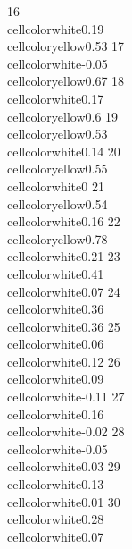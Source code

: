 \documentclass{article}\usepackage[]{graphicx}\usepackage[]{color}
\begin{document}
16   \\cellcolor{white}{0.19} \\cellcolor{yellow}{0.53}
17  \\cellcolor{white}{-0.05} \\cellcolor{yellow}{0.67}
18   \\cellcolor{white}{0.17}  \\cellcolor{yellow}{0.6}
19  \\cellcolor{yellow}{0.53}  \\cellcolor{white}{0.14}
20  \\cellcolor{yellow}{0.55}     \\cellcolor{white}{0}
21  \\cellcolor{yellow}{0.54}  \\cellcolor{white}{0.16}
22  \\cellcolor{yellow}{0.78}  \\cellcolor{white}{0.21}
23   \\cellcolor{white}{0.41}  \\cellcolor{white}{0.07}
24   \\cellcolor{white}{0.36}  \\cellcolor{white}{0.36}
25   \\cellcolor{white}{0.06}  \\cellcolor{white}{0.12}
26   \\cellcolor{white}{0.09} \\cellcolor{white}{-0.11}
27   \\cellcolor{white}{0.16} \\cellcolor{white}{-0.02}
28  \\cellcolor{white}{-0.05}  \\cellcolor{white}{0.03}
29   \\cellcolor{white}{0.13}  \\cellcolor{white}{0.01}
30   \\cellcolor{white}{0.28}  \\cellcolor{white}{0.07}
\end{document}
